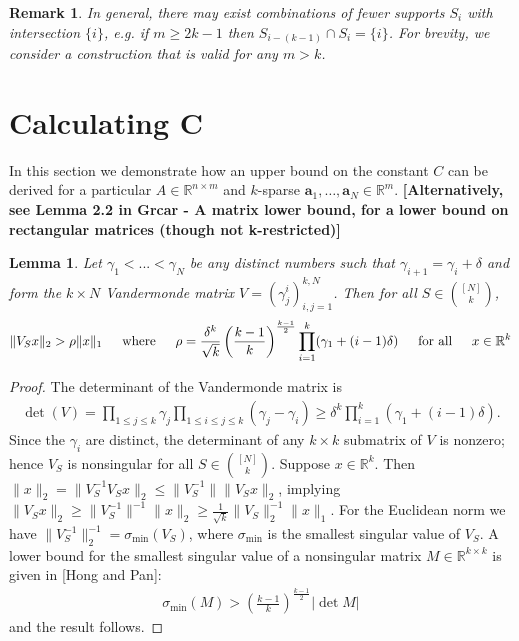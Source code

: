 \documentclass[journal, onecolumn]{IEEEtran}
\newtheorem{lemma}{Lemma}
\newtheorem{remark}{Remark}
\begin{document}
\begin{remark}
In general, there may exist combinations of fewer supports $S_i$ with intersection $\{i\}$, e.g. if $m \geq 2k-1$ then $S_{i - (k-1)} \cap S_i = \{i\}$. For brevity, we consider a construction that is valid for any $m > k$.
\end{remark}


\section{Calculating C}

In this section we demonstrate how an upper bound on the constant $C$ can be derived for a particular $A \in \mathbb{R}^{n \times m}$ and $k$-sparse $\mathbf{a}_1, \ldots, \mathbf{a}_N \in \mathbb{R}^m$. \textbf{[Alternatively, see Lemma 2.2 in Grcar - A matrix lower bound, for a lower bound on rectangular matrices (though not k-restricted)]}


\begin{lemma}\label{MatrixLowerBoundLemma}
Let $\gamma_1 < ... < \gamma_N$ be any distinct numbers such that $\gamma_{i+1} = \gamma_i + \delta$ and form the $k \times N$ Vandermonde matrix $V = (\gamma^i_j)^{k,N}_{i,j=1}$. Then for all $S \in {[N] \choose k}$, 
\begin{align}
	\|V_S x\|_2 > \rho \|x\|_1 \indent \text{where} \indent \rho = \frac{\delta^k}{\sqrt{k}} \left( \frac{k-1}{k} \right)^\frac{k-1}{2} \prod_{i = 1}^k (\gamma_1 + (i-1)\delta) \indent \text{for all} \indent x \in \mathbb{R}^k
\end{align}
\end{lemma}

\begin{proof} 
The determinant of the Vandermonde matrix is
\begin{align}
	\det(V) = \prod_{1 \leq j \leq k} \gamma_j \prod_{1 \leq i \leq j \leq k} (\gamma_j - \gamma_i) \geq \delta^k \prod_{i = 1}^k (\gamma_1 + (i-1)\delta).
\end{align}	
Since the $\gamma_i$ are distinct, the determinant of any $k \times k$ submatrix of $V$ is nonzero; hence $V_S$ is nonsingular for all $S \in {[N] \choose k}$. Suppose $x \in \mathbb{R}^k$. Then $\|x\|_2 = \|V_S^{-1} V_S x\|_2 \leq \|V_S^{-1}\| \|V_S x\|_2$, implying $\|V_Sx\|_2 \geq \|V_S^{-1}\|^{-1}\|x\|_2 \geq \frac{1}{\sqrt{k}} \|V_S\|_2^{-1}\|x\|_1$. For the Euclidean norm we have $\|V_S^{-1}\|_2^{-1} = \sigma_{\min}(V_S)$, where $\sigma_{\min}$ is the smallest singular value of $V_S$. A lower bound for the smallest singular value of a nonsingular matrix $M \in \mathbb{R}^{k \times k}$ is given in [Hong and Pan]:
\begin{align}
	\sigma_{\min}(M) > \left( \frac{k-1}{k} \right)^\frac{k-1}{2} |\det M|
\end{align}
%
and the result follows. 
\end{proof}
\end{document}
